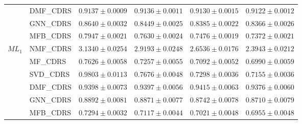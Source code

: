 \documentclass[pdflatex,sn-mathphys-num]{sn-jnl}%
\theoremstyle{thmstyleone}%
\theoremstyle{thmstyletwo}%
\theoremstyle{thmstylethree}%
\begin{document}
\begin{longtable}{llcccc}
 & DMF\_CDRS & $0.9137\pm0.0009$ & $0.9136\pm0.0011$ & $0.9130\pm0.0015$ & $0.9122\pm0.0012$ \\
 & GNN\_CDRS & $0.8640\pm0.0032$ & $0.8449\pm0.0025$ & $0.8385\pm0.0022$ & $0.8366\pm0.0026$ \\
 & MFB\_CDRS & $0.7947\pm0.0021$ & $0.7630\pm0.0024$ & $0.7476\pm0.0019$ & $0.7372\pm0.0021$ \\
\midrule
$ML_1$ & NMF\_CDRS & $3.1340\pm0.0254$ & $2.9193\pm0.0248$ & $2.6536\pm0.0176$ & $2.3943\pm0.0212$ \\
 & MF\_CDRS & $0.7626\pm0.0058$ & $0.7257\pm0.0055$ & $0.7092\pm0.0052$ & $0.6990\pm0.0059$ \\
 & SVD\_CDRS & $0.9803\pm0.0113$ & $0.7676\pm0.0048$ & $0.7298\pm0.0036$ & $0.7155\pm0.0036$ \\
 & DMF\_CDRS & $0.9398\pm0.0073$ & $0.9397\pm0.0056$ & $0.9415\pm0.0063$ & $0.9376\pm0.0060$ \\
 & GNN\_CDRS & $0.8892\pm0.0081$ & $0.8871\pm0.0077$ & $0.8742\pm0.0078$ & $0.8710\pm0.0079$ \\
 & MFB\_CDRS & $0.7294\pm0.0032$ & $0.7117\pm0.0044$ & $0.7021\pm0.0048$ & $0.6955\pm0.0048$ \\
\end{longtable}
\end{document}

